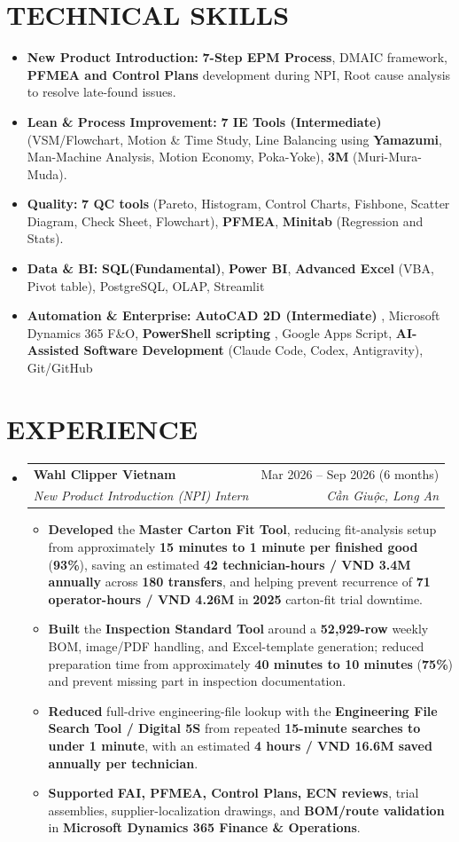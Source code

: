 \documentclass[a4paper,10pt]{article}
\makeatletter
\newcommand{\resumeItem}[1]{\item\small #1}
\newcommand{\resumeSubheading}[4]{
  \item
  \begin{tabularx}{\textwidth}[t]{@{}>{\raggedright\arraybackslash}X r@{}}
    \textbf{#1} & #2 \\
    \textit{\small #3} & \textit{\small #4} \\
  \end{tabularx}
}
\newcommand{\resumeSubHeadingListStart}{\begin{itemize}[leftmargin=0in,label={},itemsep=4.2pt,topsep=0pt,parsep=0pt,partopsep=0pt]}
\newcommand{\resumeSubHeadingListEnd}{\end{itemize}}
\newcommand{\resumeItemListStart}{\begin{itemize}[leftmargin=0.22in,itemsep=2.1pt,topsep=2.1pt,parsep=0pt,partopsep=0pt]}
\newcommand{\resumeItemListEnd}{\end{itemize}}
\makeatother
\begin{document}
\section{TECHNICAL SKILLS}
\begin{itemize}[leftmargin=0.15in,label={},itemsep=3pt,topsep=0pt,parsep=0pt,partopsep=0pt]
  \small
  \item \textbf{New Product Introduction:} \textbf{7-Step EPM Process}, DMAIC framework, \textbf{PFMEA and Control Plans} development during NPI, Root cause analysis to resolve late-found issues.
  \item \textbf{Lean \& Process Improvement:} \textbf{7 IE Tools (Intermediate)} (VSM/Flowchart, Motion \& Time Study, Line Balancing using \textbf{Yamazumi}, Man-Machine Analysis, Motion Economy, Poka-Yoke), \textbf{3M} (Muri-Mura-Muda).
  \item \textbf{Quality:} \textbf{7 QC tools} (Pareto, Histogram, Control Charts, Fishbone, Scatter Diagram, Check Sheet, Flowchart), \textbf{PFMEA}, \textbf{Minitab} (Regression and Stats).
  \item \textbf{Data \& BI:} \textbf{SQL(Fundamental)}, \textbf{Power BI}, \textbf{Advanced Excel} (VBA, Pivot table), PostgreSQL, OLAP, Streamlit
  \item \textbf{Automation \& Enterprise:}  \textbf{AutoCAD 2D (Intermediate)} ,  Microsoft Dynamics 365 F\&O, \textbf{PowerShell scripting} , Google Apps Script, \textbf{AI-Assisted Software Development} (Claude Code, Codex, Antigravity), Git/GitHub
\end{itemize}

\section{EXPERIENCE}
\resumeSubHeadingListStart
  \resumeSubheading
    {Wahl Clipper Vietnam}{Mar 2026 -- Sep 2026 (6 months)}
    {New Product Introduction (NPI) Intern}{Cần Giuộc, Long An}
  \resumeItemListStart
    \resumeItem{\textbf{Developed} the \textbf{Master Carton Fit Tool}, reducing fit-analysis setup from approximately \textbf{15 minutes to 1 minute per finished good} (\textbf{93\%}), saving an estimated \textbf{42 technician-hours / VND 3.4M annually} across \textbf{180 transfers}, and helping prevent recurrence of \textbf{71 operator-hours / VND 4.26M} in \textbf{2025} carton-fit trial downtime.}
    \resumeItem{\textbf{Built} the \textbf{Inspection Standard Tool} around a \textbf{52,929-row} weekly BOM, image/PDF handling, and Excel-template generation; reduced preparation time from approximately \textbf{40 minutes to 10 minutes} (\textbf{75\%}) and prevent missing part in inspection documentation.}
    \resumeItem{\textbf{Reduced} full-drive engineering-file lookup with the \textbf{Engineering File Search Tool / Digital 5S} from repeated \textbf{15-minute searches to under 1 minute}, with an estimated \textbf{4 hours / VND 16.6M saved annually per technician}.}
    \resumeItem{\textbf{Supported} \textbf{FAI, PFMEA, Control Plans, ECN reviews}, trial assemblies, supplier-localization drawings, and \textbf{BOM/route validation} in \textbf{Microsoft Dynamics 365 Finance \& Operations}.}
  \resumeItemListEnd
\resumeSubHeadingListEnd
\end{document}
